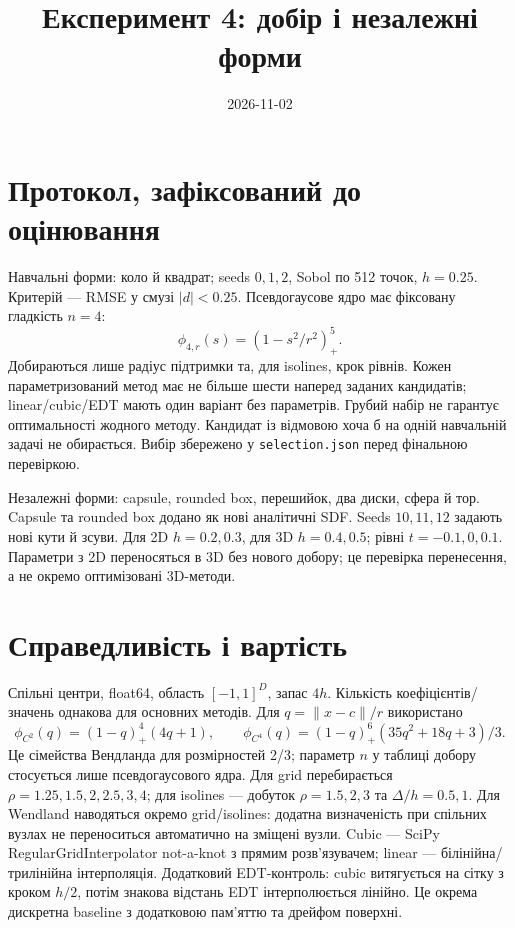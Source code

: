 \documentclass[11pt,a4paper]{article}
\begin{document}
\title{Експеримент 4: добір і незалежні форми}\author{}\date{2026-11-02}\maketitle

\section*{Протокол, зафіксований до оцінювання}
Навчальні форми: коло й квадрат; seeds $0,1,2$, Sobol по 512 точок,
$h=0.25$. Критерій --- RMSE у смузі $|d|<0.25$.
Псевдогаусове ядро має фіксовану гладкість $n=4$:
\[
 \phi_{4,r}(s)=(1-s^2/r^2)_+^5.
\]
Добираються лише радіус підтримки та, для isolines, крок рівнів.
Кожен параметризований метод має не більше шести наперед заданих
кандидатів; linear/cubic/EDT мають один варіант без параметрів.
Грубий набір не гарантує оптимальності жодного методу.
Кандидат із відмовою хоча б на одній навчальній задачі не обирається.
Вибір збережено у \texttt{selection.json} перед фінальною перевіркою.

Незалежні форми: capsule, rounded box, перешийок, два диски,
сфера й тор. Capsule та rounded box додано як нові аналітичні SDF.
Seeds $10,11,12$ задають нові кути й зсуви.
Для 2D $h=0.2,0.3$, для 3D $h=0.4,0.5$; рівні $t=-0.1,0,0.1$.
Параметри з 2D переносяться в 3D без нового добору; це перевірка
перенесення, а не окремо оптимізовані 3D-методи.

\section*{Справедливість і вартість}
Спільні центри, float64, область $[-1,1]^D$, запас $4h$.
Кількість коефіцієнтів/значень однакова для основних методів.
Для $q=\|x-c\|/r$ використано
\[
 \phi_{C^2}(q)=(1-q)_+^4(4q+1),\qquad
 \phi_{C^4}(q)=(1-q)_+^6(35q^2+18q+3)/3.
\]
Це сімейства Вендланда для розмірностей 2/3; параметр $n$
у таблиці добору стосується лише псевдогаусового ядра.
Для grid перебирається $\rho=1.25,1.5,2,2.5,3,4$;
для isolines --- добуток $\rho=1.5,2,3$ та $\Delta/h=0.5,1$.
Для Wendland наводяться окремо grid/isolines: додатна визначеність
при спільних вузлах не переноситься автоматично на зміщені вузли.
Cubic --- SciPy RegularGridInterpolator not-a-knot з прямим
розв'язувачем; linear --- білінійна/трилінійна інтерполяція.
Додатковий EDT-контроль: cubic витягується на сітку з кроком $h/2$,
потім знакова відстань EDT інтерполюється лінійно. Це окрема
дискретна baseline з додатковою пам'яттю та дрейфом поверхні.
\end{document}
